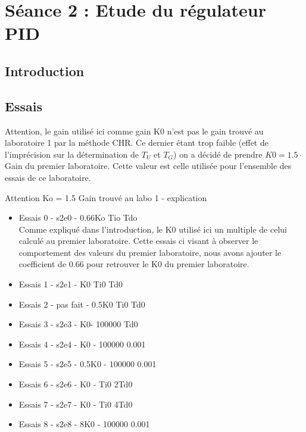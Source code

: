 \section{Séance 2 : Etude du régulateur PID}
\subsection{Introduction}

\subsection{Essais}
Attention, le gain utilisé ici comme gain K0 n'est pas le gain trouvé au laboratoire 1 par la méthode CHR. Ce dernier étant trop faible (effet de l'imprécision sur la détermination de $T_{U}$ et $T_{G}$) on a décidé de prendre $K0 = 1.5 \cdot$ Gain du premier laboratoire. Cette valeur est celle utilisée pour l'ensemble des essais de ce laboratoire. 

Attention Ko = 1.5 Gain trouvé au labo 1 - explication
\begin{itemize}
\item Essais 0 - s2e0 - 0.66Ko Tio Tdo\\
Comme expliqué dans l'introduction, le K0 utilisé ici un multiple de celui calculé au premier laboratoire. Cette essais ci visant à observer le comportement des valeurs du premier laboratoire, nous avons ajouter le coefficient de 0.66 pour retrouver le K0 du premier laboratoire.

\item Essais 1 - s2e1 - K0 Ti0 Td0

\item Essais 2 - pas fait - 0.5K0 Ti0 Td0 

\item Essais 3 - s2e3 - K0- 100000 Td0

\item Essais 4 - s2e4 - K0 - 100000 0.001

\item Essais 5 - s2e5 - 0.5K0 - 100000 0.001

\item Essais 6 - s2e6 - K0 - Ti0 2Td0

\item Essais 7 - s2e7 - K0 - Ti0 4Td0

\item Essais 8 - s2e8 - 8K0 - 100000 0.001





\end{itemize}